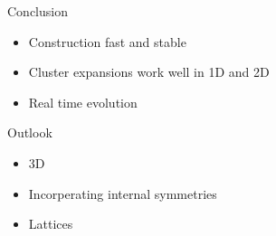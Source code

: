 \begin{frame}{Conclusion}
    \begin{itemize}
        \item Construction fast and stable
        \item Cluster expansions work well in 1D and 2D
        \item Real time evolution
    \end{itemize}
\end{frame}

\begin{frame}{Outlook}
    \begin{itemize}
        \item 3D
        \item Incorperating internal symmetries
        \item Lattices
    \end{itemize}
\end{frame}